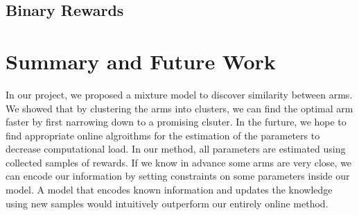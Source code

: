 \documentclass{article}
\begin{document}
\subsection{Binary Rewards}

\section{Summary and Future Work}
In our project, we proposed a mixture model to discover similarity between arms. We showed that by clustering the arms into clusters, we can find the optimal arm faster by first narrowing down to a promising clsuter. In the furture, we hope to find appropriate online algroithms for the estimation of the parameters to decrease computational load. In our method, all parameters are estimated using collected samples of rewards. If we know in advance some arms are very close, we can encode our information by setting constraints on some parameters inside our model. A model that encodes known information and updates the knowledge using new samples would intuitively outperform our entirely online method. 



\end{document}
